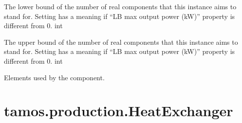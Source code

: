 \documentclass[letterpaper,10pt,english]{sphinxmanual}
\begin{document}
\begin{fulllineitems}
\begin{fulllineitems}
\label{\detokenize{generated/tamos.production.GasBoiler:tamos.production.GasBoiler.units_number_lb}}
\pysigstartsignatures
{}
\pysigstopsignatures
\sphinxAtStartPar
The lower bound of the number of real components that this instance aims to stand for.
Setting  has a meaning if “LB max output power (kW)” property is different from 0.
int

\end{fulllineitems}


\begin{fulllineitems}
\label{\detokenize{generated/tamos.production.GasBoiler:tamos.production.GasBoiler.units_number_ub}}
\pysigstartsignatures
{}
\pysigstopsignatures
\sphinxAtStartPar
The upper bound of the number of real components that this instance aims to stand for.
Setting  has a meaning if “LB max output power (kW)” property is different from 0.
int

\end{fulllineitems}


\begin{fulllineitems}
\label{\detokenize{generated/tamos.production.GasBoiler:tamos.production.GasBoiler.used_elements}}
\pysigstartsignatures
{}
\pysigstopsignatures
\sphinxAtStartPar
Elements used by the component.

\end{fulllineitems}


\end{fulllineitems}


\sphinxstepscope


\section{tamos.production.HeatExchanger}
\label{\detokenize{generated/tamos.production.HeatExchanger:tamos-production-heatexchanger}}\label{\detokenize{generated/tamos.production.HeatExchanger::doc}}
\end{document}
